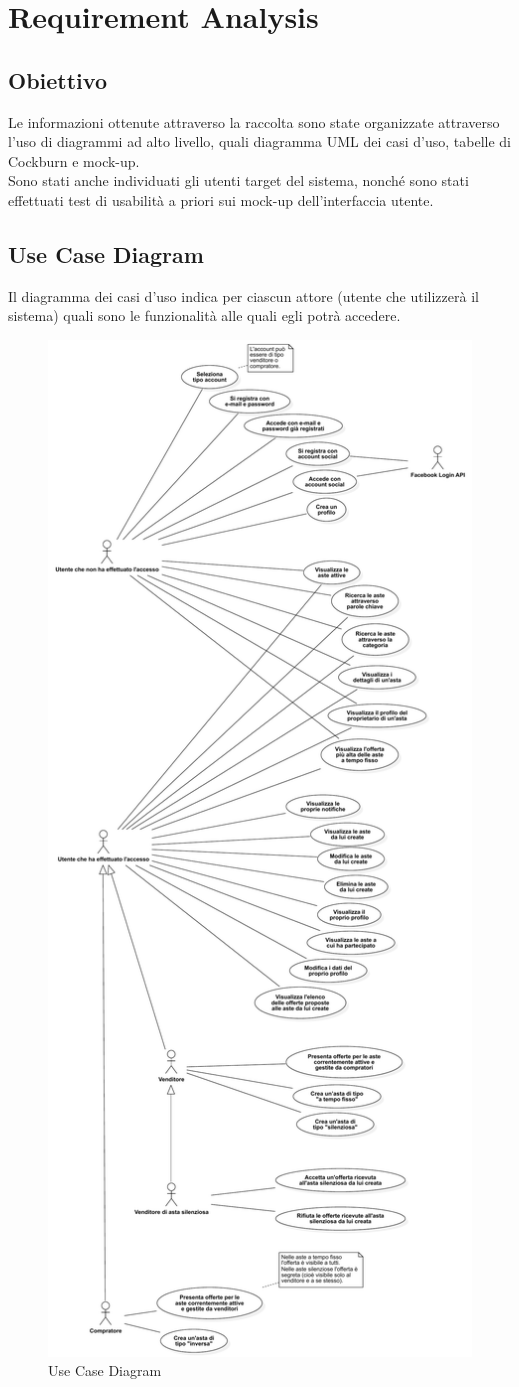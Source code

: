 
\chapter{Requirement Analysis}
    \section{Obiettivo}
        Le informazioni ottenute attraverso la raccolta sono state organizzate attraverso l'uso di diagrammi ad alto livello, quali diagramma UML dei casi d'uso, tabelle di Cockburn e mock-up. \\
        Sono stati anche individuati gli utenti target del sistema, nonché sono stati effettuati test di usabilità a priori sui mock-up dell'interfaccia utente.

    \section{Use Case Diagram}
        Il diagramma dei casi d'uso indica per ciascun attore (utente che utilizzerà il sistema) quali sono le funzionalità alle quali egli potrà accedere.
        \begin{figure}[htbp!]
            \centering
                \includegraphics[width=0.325\linewidth]{Immagini/Diagrammi/UseCaseDiagram.pdf}
            \caption{Use Case Diagram}
            \label{fig:Use Case Diagram}
        \end{figure}
    
